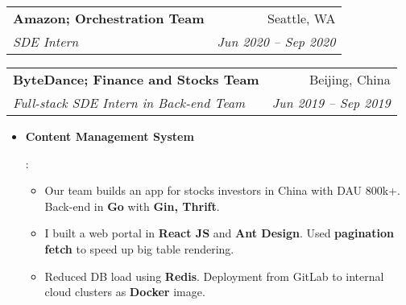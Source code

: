 \documentclass[letterpaper,11pt]{article}
\makeatletter
\newcommand{\resumeItem}[2]{
  \item\small{
    \textbf{#1}{: #2 \vspace{-2pt}}
  }
}
\newcommand{\resumeSubheading}[4]{
  \vspace{-1pt}\item
    \begin{tabular*}{0.97\textwidth}[t]{l@{\extracolsep{\fill}}r}
      \textbf{#1} & #2 \\
      \textit{\small#3} & \textit{\small #4} \\
    \end{tabular*}\vspace{-5pt}
}
\newcommand{\resumeItemListStart}{\begin{itemize}}
\newcommand{\resumeItemListEnd}{\end{itemize}\vspace{-5pt}}
\newcommand{\ifDefaultVersion}[1]{ \expandafter\ifstrequal\expandafter{\jobname}{fan_jin_resume}{#1}{} }
\newcommand{\ifEasyVersion}[1]{ \expandafter\ifstrequal\expandafter{\jobname}{fan_jin_resume_easy_version}{#1}{} }
\makeatother
\begin{document}
    \resumeSubheading
      {Amazon; Orchestration Team}{Seattle, WA}
      {SDE Intern}{Jun 2020 -- Sep 2020}{
      \ifDefaultVersion{
      \resumeItemListStart
        \resumeItem{Micro-services Data Summarization}{
          \begin{itemize}
            \item Our team owns a tool to orchestrate micro-services and visualize billions of process workflows per day.
            \item I built a scheduler to fetch daily summaries from \textbf{ElasticSearch} and persist them in \textbf{DynamoDB}.
            \item I built a web portal in \textbf{Angular} to present persisted data, deployed serverless as \textbf{AWS Lambda} and \textbf{Step Functions}.
          \end{itemize}
        }
      \resumeItemListEnd
      }
      \ifEasyVersion{
      \resumeItemListStart
        \resumeItem{Micro-services Data Summarization}{
          \begin{itemize}
            \item My duty as intern was to develop a software feature which is related to our team's software product.
            \item I built a scheduler to fetch daily summaries from existing system, analyze them, and then present the result in a web page.
            \item I applied what I learned in school courses to my intern project and made it more scalable and cost efficient.
          \end{itemize}
        }
      \resumeItemListEnd
      }
      }

    \resumeSubheading
      {ByteDance; Finance and Stocks Team}{Beijing, China}
      {Full-stack SDE Intern in Back-end Team}{Jun 2019 -- Sep 2019}
      \resumeItemListStart
        \resumeItem{Content Management System}{
          \begin{itemize}
            \item Our team builds an app for stocks investors in China with DAU 800k+. Back-end in \textbf{Go} with \textbf{Gin, Thrift}.
            \item I built a web portal in \textbf{React JS} and \textbf{Ant Design}. Used \textbf{pagination fetch} to speed up big table rendering.
            \item Reduced DB load using \textbf{Redis}. Deployment from GitLab to internal cloud clusters as \textbf{Docker} image.
          \end{itemize}
        }
      \resumeItemListEnd
\end{document}
